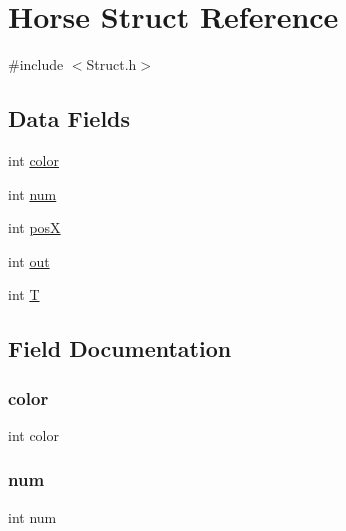 \hypertarget{struct_horse}{}\section{Horse Struct Reference}
\label{struct_horse}


{\ttfamily \#include $<$Struct.\+h$>$}

\subsection*{Data Fields}
\begin{DoxyCompactItemize}
\item 
int \hyperlink{struct_horse_a0fd02fb9277ffcb35a75066ffe95e8c7}{color}
\item 
int \hyperlink{struct_horse_a86cf672daa4e0ad11ad10efc894d19c8}{num}
\item 
int \hyperlink{struct_horse_ab34f89ef94db9dd6d3a04425dd6d9c9d}{posX}
\item 
int \hyperlink{struct_horse_aa8000eda101cade7c6c4b913fce0cc9c}{out}
\item 
int \hyperlink{struct_horse_a94960b2af438191aca84d0ea3a690af3}{T}
\end{DoxyCompactItemize}


\subsection{Field Documentation}
\mbox{\label{struct_horse_a0fd02fb9277ffcb35a75066ffe95e8c7}} 
\subsubsection{\texorpdfstring{color}{color}}
{\footnotesize\ttfamily int color}

\mbox{\label{struct_horse_a86cf672daa4e0ad11ad10efc894d19c8}} 
\subsubsection{\texorpdfstring{num}{num}}
{\footnotesize\ttfamily int num}

\mbox{\label{struct_horse_aa8000eda101cade7c6c4b913fce0cc9c}} 
